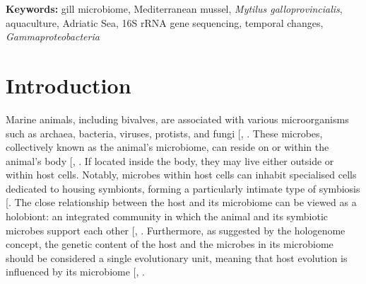 \documentclass[
  12 pt,
]{article}
\begin{document}
\noindent
\textbf{Keywords:} gill microbiome, Mediterranean mussel, \emph{Mytilus galloprovincialis}, aquaculture, Adriatic Sea, 16S rRNA gene sequencing, temporal changes, \emph{Gammaproteobacteria}
\newpage

\section{Introduction}\label{introduction}

Marine animals, including bivalves, are associated with various microorganisms such as archaea, bacteria, viruses, protists, and fungi {[}, \citeproc{ref-Salloum2025}{2}{]}. These microbes, collectively known as the animal's microbiome, can reside on or within the animal's body {[}, \citeproc{ref-Petersen2018}{3}{]}. If located inside the body, they may live either outside or within host cells. Notably, microbes within host cells can inhabit specialised cells dedicated to housing symbionts, forming a particularly intimate type of symbiosis {[}\citeproc{ref-Petersen2018}{3}{]}. The close relationship between the host and its microbiome can be viewed as a holobiont: an integrated community in which the animal and its symbiotic microbes support each other {[}, \citeproc{ref-Margulis1991}{4}{]}. Furthermore, as suggested by the hologenome concept, the genetic content of the host and the microbes in its microbiome should be considered a single evolutionary unit, meaning that host evolution is influenced by its microbiome {[}, \citeproc{ref-Bordenstein2015}{5}{]}.
\end{document}
